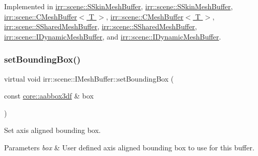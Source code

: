 Implemented in \hyperlink{structirr_1_1scene_1_1SSkinMeshBuffer_ab4d3b6c78a4a3cfe368af4c89350497f}{irr\+::scene\+::\+S\+Skin\+Mesh\+Buffer}, \hyperlink{structirr_1_1scene_1_1SSkinMeshBuffer_ab4d3b6c78a4a3cfe368af4c89350497f}{irr\+::scene\+::\+S\+Skin\+Mesh\+Buffer}, \hyperlink{classirr_1_1scene_1_1CMeshBuffer_ab5a21d48a5af73f1ef880a48c3798a67}{irr\+::scene\+::\+C\+Mesh\+Buffer$<$ T $>$}, \hyperlink{classirr_1_1scene_1_1CMeshBuffer_ab5a21d48a5af73f1ef880a48c3798a67}{irr\+::scene\+::\+C\+Mesh\+Buffer$<$ T $>$}, \hyperlink{structirr_1_1scene_1_1SSharedMeshBuffer_a54e11fd284245c3f5e5e07145ad4a202}{irr\+::scene\+::\+S\+Shared\+Mesh\+Buffer}, \hyperlink{structirr_1_1scene_1_1SSharedMeshBuffer_a54e11fd284245c3f5e5e07145ad4a202}{irr\+::scene\+::\+S\+Shared\+Mesh\+Buffer}, \hyperlink{classirr_1_1scene_1_1IDynamicMeshBuffer_adbe127e3774de6ae7ce96cb534a336e5}{irr\+::scene\+::\+I\+Dynamic\+Mesh\+Buffer}, and \hyperlink{classirr_1_1scene_1_1IDynamicMeshBuffer_adbe127e3774de6ae7ce96cb534a336e5}{irr\+::scene\+::\+I\+Dynamic\+Mesh\+Buffer}.

\mbox{\label{classirr_1_1scene_1_1IMeshBuffer_adbbfb7757dfbba7357193d2280893df6}} 
\subsubsection{\texorpdfstring{set\+Bounding\+Box()}{setBoundingBox()}\hspace{0.1cm}{\footnotesize\ttfamily [2/2]}}
{\footnotesize\ttfamily virtual void irr\+::scene\+::\+I\+Mesh\+Buffer\+::set\+Bounding\+Box (\begin{DoxyParamCaption}\item[{const \hyperlink{namespaceirr_1_1core_a60f4b4c744aba55f10530d503c6ecb04}{core\+::aabbox3df} \&}]{box }\end{DoxyParamCaption})\hspace{0.3cm}{\ttfamily [pure virtual]}}



Set axis aligned bounding box. 


\begin{DoxyParams}{Parameters}
{\em box} & User defined axis aligned bounding box to use for this buffer. \\
\hline
\end{DoxyParams}


